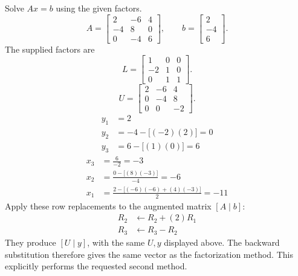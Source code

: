 \goal Solve $Ax=b$ using the given factors.
\[A=\left[\begin{matrix}2 & -6 & 4\\-4 & 8 & 0\\0 & -4 & 6\end{matrix}\right],\qquad b=\left[\begin{matrix}2\\-4\\6\end{matrix}\right].\]
The supplied factors are
\[L=\left[\begin{matrix}1 & 0 & 0\\-2 & 1 & 0\\0 & 1 & 1\end{matrix}\right].\]
\[U=\left[\begin{matrix}2 & -6 & 4\\0 & -4 & 8\\0 & 0 & -2\end{matrix}\right].\]
\begin{align*}y_{1}&=2\\
y_{2}&=-4-\bigl[(-2)(2)\bigr]=0\\
y_{3}&=6-\bigl[(1)(0)\bigr]=6\end{align*}
\begin{align*}x_{3}&=\frac{6}{-2}=-3\\
x_{2}&=\frac{0-\bigl[(8)(-3)\bigr]}{-4}=-6\\
x_{1}&=\frac{2-\bigl[(-6)(-6)+(4)(-3)\bigr]}{2}=-11\end{align*}
Apply these row replacements to the augmented matrix $[A\mid b]$:
\begin{align*}R_{2}&\leftarrow R_{2}+(2)R_{1}\\
R_{3}&\leftarrow R_{3}-R_{2}\end{align*}They produce $[U\mid y]$, with the same $U,y$ displayed above.
The backward substitution therefore gives the same vector as the
factorization method. This explicitly performs the requested second method.

